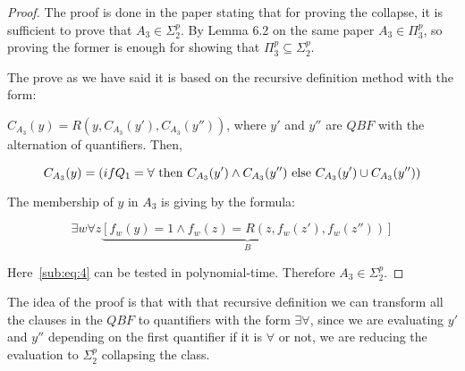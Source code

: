\documentclass[12pt, a4paper]{article}
\begin{document}
\begin{proof}
  The proof is done in the paper stating that for proving the collapse, it is sufficient to prove that $A_3 \in \Sigma_2^p$. By Lemma 6.2 on the same paper $A_3 \in \Pi_3^p$, so proving the former is enough for showing that $\Pi_3^p \subseteq \Sigma_2^p$.

  The prove as we have said it is based on the recursive definition method with the form:

  $C_{A_3}(y) = R(y, C_{A_3}(y'), C_{A_3}(y''))$, where $y'$ and $y''$ are $QBF$ with the alternation of quantifiers. Then,

  \begin{equation}
    C_{A_3}(y) = (\\if Q_1 = \forall\ \text{then}\ C_{A_3}(y') \land C_{A_3}(y'')\ \text{else}\ C_{A_3}(y') \cup C_{A_3}(y''))
  \end{equation}

  The membership of $y$ in $A_3$ is giving by the formula:

  \begin{equation}
    \exists w \forall z \underbrace{[f_w(y) = 1 \land f_w(z) = R(z, f_w(z'), f_w(z''))]}_B \label{sub:eq:4}
  \end{equation}

  Here~\ref{sub:eq:4} can be tested in polynomial-time. Therefore $A_3 \in \Sigma_2^p$.

\end{proof}

The idea of the proof is that with that recursive definition we can transform all the clauses in the $QBF$ to quantifiers with the form $\exists\forall$, since we are evaluating $y'$ and $y''$ depending on the first quantifier if it is $\forall$ or not, we are reducing the evaluation to $\Sigma_2^p$ collapsing the class.



\end{document}
